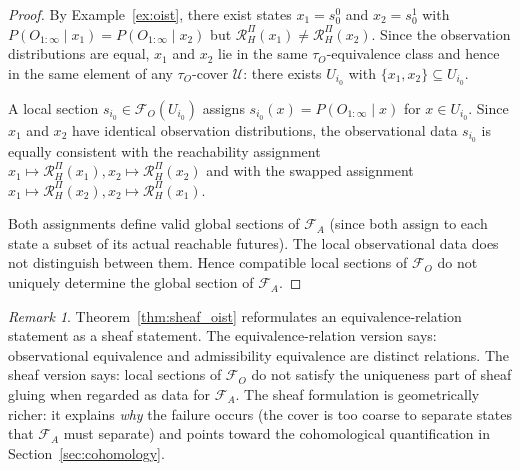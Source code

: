 \documentclass[11pt, a4paper]{article}
\theoremstyle{plain}
\theoremstyle{definition}
\theoremstyle{remark}
\newtheorem{remark}[theorem]{Remark}
\newcommand{\calF}{\mathcal{F}}
\newcommand{\RHP}{\mathcal{R}_{H}^{\Pi}}
\begin{document}
\begin{proof}
By Example~\ref{ex:oist}, there exist states $x_1 = s_0^0$ and $x_2 = s_0^1$
with $P(O_{1:\infty} \mid x_1) = P(O_{1:\infty} \mid x_2)$ but
$\RHP(x_1) \neq \RHP(x_2)$. Since the observation distributions are equal,
$x_1$ and $x_2$ lie in the same $\tau_O$-equivalence class and hence in the
same element of any $\tau_O$-cover $\mathcal{U}$: there exists $U_{i_0}$
with $\{x_1, x_2\} \subseteq U_{i_0}$.

A local section $s_{i_0} \in \calF_O(U_{i_0})$ assigns $s_{i_0}(x) =
P(O_{1:\infty} \mid x)$ for $x \in U_{i_0}$. Since $x_1$ and $x_2$ have
identical observation distributions, the observational data $s_{i_0}$ is
equally consistent with the reachability assignment $x_1 \mapsto \RHP(x_1),
x_2 \mapsto \RHP(x_2)$ and with the swapped assignment $x_1 \mapsto
\RHP(x_2), x_2 \mapsto \RHP(x_1)$.

Both assignments define valid global sections of $\calF_A$ (since both assign
to each state a subset of its actual reachable futures). The local observational
data does not distinguish between them. Hence compatible local sections of
$\calF_O$ do not uniquely determine the global section of $\calF_A$.
\end{proof}

\begin{remark}
Theorem~\ref{thm:sheaf_oist} reformulates an equivalence-relation statement as
a sheaf statement. The equivalence-relation version says: observational
equivalence and admissibility equivalence are distinct relations. The sheaf
version says: local sections of $\calF_O$ do not satisfy the uniqueness part
of sheaf gluing when regarded as data for $\calF_A$. The sheaf formulation is
geometrically richer: it explains \emph{why} the failure occurs (the cover is
too coarse to separate states that $\calF_A$ must separate) and points toward
the cohomological quantification in Section~\ref{sec:cohomology}.
\end{remark}
\end{document}
